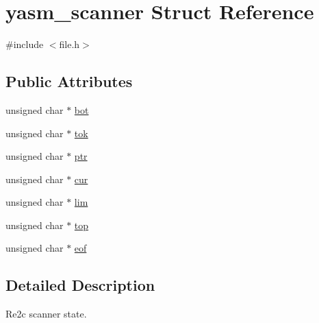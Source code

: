 \hypertarget{structyasm__scanner}{\section{yasm\-\_\-scanner Struct Reference}
\label{structyasm__scanner}
}


{\ttfamily \#include $<$file.\-h$>$}

\subsection*{Public Attributes}
\begin{DoxyCompactItemize}
\item 
unsigned char $\ast$ \hyperlink{structyasm__scanner_ad9b2d3ca81aacaf1f7a8a9a49d6d226b}{bot}
\item 
unsigned char $\ast$ \hyperlink{structyasm__scanner_a056e33a79082abaa3a75c13729719416}{tok}
\item 
unsigned char $\ast$ \hyperlink{structyasm__scanner_a6c6bbd227be15e70ad746f0388e6d6fe}{ptr}
\item 
unsigned char $\ast$ \hyperlink{structyasm__scanner_a279716c6c031e925885b4f73743da881}{cur}
\item 
unsigned char $\ast$ \hyperlink{structyasm__scanner_aac3201b372e7dceb325f9ab0e62f8e91}{lim}
\item 
unsigned char $\ast$ \hyperlink{structyasm__scanner_a7b71663793493f82599d7a9fe6bcb665}{top}
\item 
unsigned char $\ast$ \hyperlink{structyasm__scanner_a869a51d64f696b917340ac49c448152a}{eof}
\end{DoxyCompactItemize}


\subsection{Detailed Description}
Re2c scanner state. 

